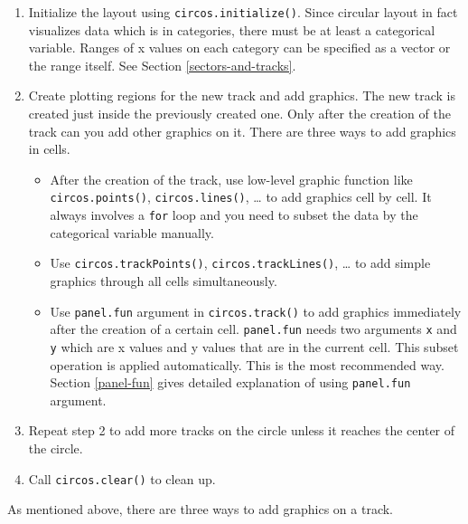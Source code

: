 \documentclass[]{book}
\providecommand{\tightlist}{%
  \setlength{\itemsep}{0pt}\setlength{\parskip}{0pt}}
\theoremstyle{definition}
\theoremstyle{definition}
\theoremstyle{remark}
\begin{document}
\begin{enumerate}
\def\labelenumi{\arabic{enumi}.}
\item
  Initialize the layout using \texttt{circos.initialize()}. Since
  circular layout in fact visualizes data which is in categories, there
  must be at least a categorical variable. Ranges of x values on each
  category can be specified as a vector or the range itself. See Section
  \ref{sectors-and-tracks}.
\item
  Create plotting regions for the new track and add graphics. The new
  track is created just inside the previously created one. Only after
  the creation of the track can you add other graphics on it. There are
  three ways to add graphics in cells.

  \begin{itemize}
  \tightlist
  \item
    After the creation of the track, use low-level graphic function like
    \texttt{circos.points()}, \texttt{circos.lines()}, \ldots{} to add
    graphics cell by cell. It always involves a \texttt{for} loop and
    you need to subset the data by the categorical variable manually.
  \item
    Use \texttt{circos.trackPoints()}, \texttt{circos.trackLines()},
    \ldots{} to add simple graphics through all cells simultaneously.
  \item
    Use \texttt{panel.fun} argument in \texttt{circos.track()} to add
    graphics immediately after the creation of a certain cell.
    \texttt{panel.fun} needs two arguments \texttt{x} and \texttt{y}
    which are x values and y values that are in the current cell. This
    subset operation is applied automatically. This is the most
    recommended way. Section \ref{panel-fun} gives detailed explanation
    of using \texttt{panel.fun} argument.
  \end{itemize}
\item
  Repeat step 2 to add more tracks on the circle unless it reaches the
  center of the circle.
\item
  Call \texttt{circos.clear()} to clean up.
\end{enumerate}

As mentioned above, there are three ways to add graphics on a track.
\end{document}
